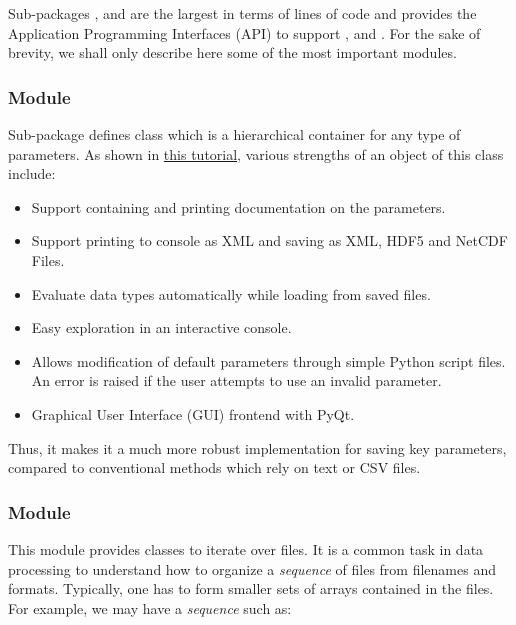 \documentclass{../jors}
\begin{document}
Sub-packages ,  and  are the
largest in terms of lines of code and provides the Application Programming
Interfaces (API) to support ,  and
.
%
For the sake of brevity, we shall only describe here some of the most important
modules.

\subsubsection*{Module }

Sub-package  defines class
 which is a hierarchical container for any type of
parameters. As shown in
\href{http://fluiddyn.readthedocs.io/en/latest/ipynb/tuto_paramscontainer.html}{%
this tutorial}, various strengths of an object of this class include:
\begin{itemize}
\item Support containing and printing documentation on the parameters.
\item Support printing to console as XML and saving as XML, HDF5 and NetCDF
Files.
\item Evaluate data types automatically while loading from saved files.
\item Easy exploration in an interactive console.
\item Allows modification of default parameters through simple Python script
files. An error is raised if the user attempts to use an invalid parameter.
\item Graphical User Interface (GUI) frontend with PyQt.
\end{itemize}

Thus, it makes it a much more robust implementation for saving key parameters,
compared to conventional methods which rely on text or CSV files.

\subsubsection*{Module }

This module provides classes to iterate over files. It is a common task in data
processing to understand how to organize a \textit{sequence} of files from
filenames and formats. Typically, one has to form smaller sets of arrays
contained in the files. For example, we may have a \textit{sequence} such as:
\end{document}
